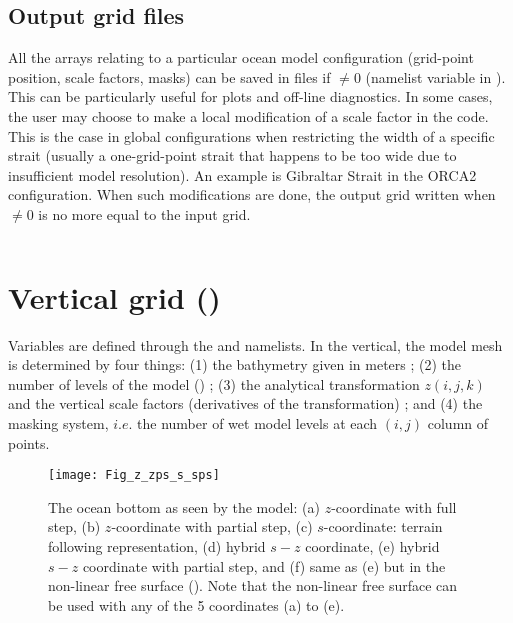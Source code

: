 \documentclass[../tex_main/NEMO_manual]{subfiles}
\begin{document}
\subsection{Output grid files}
\label{subsec:DOM_hgr_files}

All the arrays relating to a particular ocean model configuration (grid-point 
position, scale factors, masks) can be saved in files if  $\not= 0$ 
(namelist variable in ). This can be particularly useful for plots and off-line 
diagnostics. In some cases, the user may choose to make a local modification 
of a scale factor in the code. This is the case in global configurations when 
restricting the width of a specific strait (usually a one-grid-point strait that 
happens to be too wide due to insufficient model resolution). An example 
is Gibraltar Strait in the ORCA2 configuration. When such modifications are done, 
the output grid written when  $\not= 0$ is no more equal to the input grid.

$\ $\newline    %

\section{Vertical grid (\protect{})}
\label{sec:DOM_zgr}

Variables are defined through the  and  namelists.
In the vertical, the model mesh is determined by four things: 
(1) the bathymetry given in meters ; 
(2) the number of levels of the model () ; 
(3) the analytical transformation $z(i,j,k)$ and the vertical scale factors 
(derivatives of the transformation) ; 
and (4) the masking system, $i.e.$ the number of wet model levels at each 
$(i,j)$ column of points.

\begin{figure}[!tb]    \begin{center}
\texttt{[image: Fig\_z\_zps\_s\_sps]}
\caption{  \protect\label{fig:z_zps_s_sps}   
The ocean bottom as seen by the model: 
(a) $z$-coordinate with full step, 
(b) $z$-coordinate with partial step, 
(c) $s$-coordinate: terrain following representation, 
(d) hybrid $s-z$ coordinate, 
(e) hybrid $s-z$ coordinate with partial step, and 
(f) same as (e) but in the non-linear free surface (\protect{}). 
Note that the non-linear free surface can be used with any of the 
5 coordinates (a) to (e).}
\end{center}   \end{figure}
\end{document}
